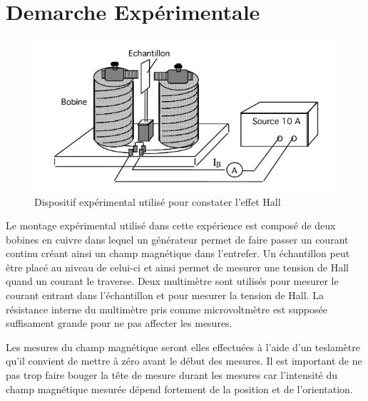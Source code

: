 \section{Demarche Expérimentale}


\begin{minipage}{\textwidth}
    \begin{figure}
        \centering
        \includegraphics[width=\linewidth]{figures/montage.png}
        \caption{Dispositif expérimental utilisé pour constater l'effet Hall \cite{notice}}
        \label{fig:montage}
        \vspace*{1cm}
    \end{figure}

    Le montage expérimental utilisé dans cette expérience est composé de deux bobines en cuivre dans lequel un générateur permet de faire passer un courant continu créant ainsi un champ magnétique dans l'entrefer. Un échantillon peut être placé au niveau de celui-ci et ainsi permet de mesurer une tension de Hall quand un courant le traverse. Deux multimètre sont utilisés pour mesurer le courant entrant dans l'échantillon et pour mesurer la tension de Hall. La résistance interne du multimètre pris comme microvoltmètre est supposée suffisament grande pour ne pas affecter les mesures.
\end{minipage}

Les mesures du champ magnétique seront elles effectuées à l'aide d'un teslamètre qu'il convient de mettre à zéro avant le début des mesures. Il est important de ne pas trop faire bouger la tête de mesure durant les mesures car l'intensité du champ magnétique mesurée dépend fortement de la position et de l'orientation.

